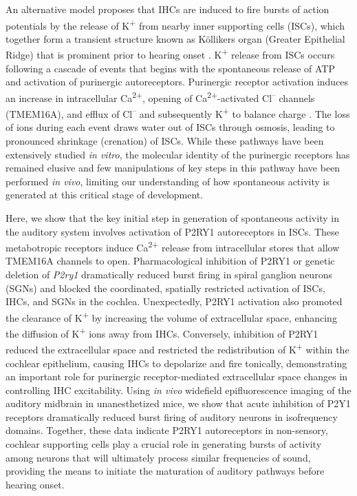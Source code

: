 \documentclass[9pt,lineno]{elife}
\begin{document}
An alternative model proposes that IHCs are induced to fire bursts of action potentials by the release of K\textsuperscript{+} from nearby inner supporting cells (ISCs), which together form a transient structure known as Köllikers organ (Greater Epithelial Ridge) that is prominent prior to hearing onset \citep{Tritsch2010b}. K\textsuperscript{+} release from ISCs occurs following a cascade of events that begins with the spontaneous release of ATP and activation of purinergic autoreceptors. Purinergic receptor activation induces an increase in intracellular Ca\textsuperscript{2+}, opening of Ca\textsuperscript{2+}-activated Cl\textsuperscript{--} channels (TMEM16A), and efflux of Cl\textsuperscript{--} and subsequently K\textsuperscript{+} to balance charge \citep{Tritsch2007,Wang2015}. The loss of ions during each event draws water out of ISCs through osmosis, leading to pronounced shrinkage (crenation) of ISCs. While these pathways have been extensively studied \textit{in vitro}, the molecular identity of the purinergic receptors has remained elusive and few manipulations of key steps in this pathway have been performed \textit{in vivo}, limiting our understanding of how spontaneous activity is generated at this critical stage of development.

Here, we show that the key initial step in generation of spontaneous activity in the auditory system involves activation of P2RY1 autoreceptors in ISCs. These metabotropic receptors induce Ca\textsuperscript{2+} release from intracellular stores that allow TMEM16A channels to open. Pharmacological inhibition of P2RY1 or genetic deletion of \textit{P2ry1} dramatically reduced burst firing in spiral ganglion neurons (SGNs) and blocked the coordinated, spatially restricted activation of ISCs, IHCs, and SGNs in the cochlea. Unexpectedly, P2RY1 activation also promoted the clearance of K\textsuperscript{+} by increasing the volume of extracellular space, enhancing the diffusion of K\textsuperscript{+} ions away from IHCs. Conversely, inhibition of P2RY1 reduced the extracellular space and restricted the redistribution of K\textsuperscript{+} within the cochlear epithelium, causing IHCs to depolarize and fire tonically, demonstrating an important role for purinergic receptor-mediated extracellular space changes in controlling IHC excitability. Using \textit{in vivo} widefield epifluorescence imaging of the auditory midbrain in unanesthetized mice, we show that acute inhibition of P2Y1 receptors dramatically reduced burst firing of auditory neurons in isofrequency domains. Together, these data indicate P2RY1 autoreceptors in non-sensory, cochlear supporting cells play a crucial role in generating bursts of activity among neurons that will ultimately process similar frequencies of sound, providing the means to initiate the maturation of auditory pathways before hearing onset.
\end{document}
